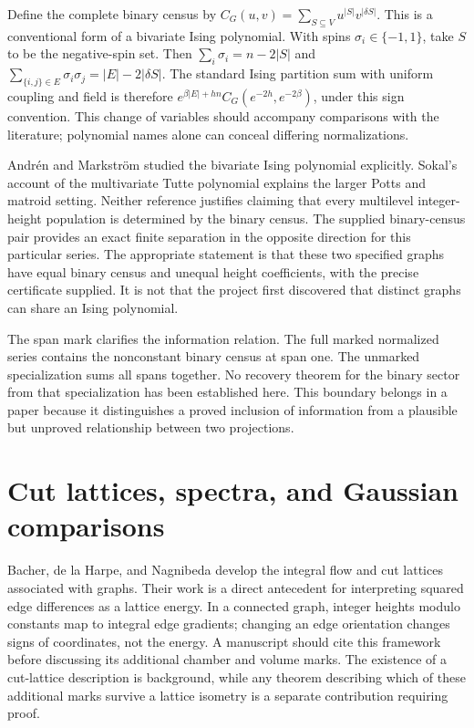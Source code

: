 \documentclass[
  11pt,
  a4paper,
]{report}
\begin{document}
Define the complete binary census by
\(C_G(u,v)=\sum_{S\subseteq V}u^{|S|}v^{|\delta S|}\). This is a
conventional form of a bivariate Ising polynomial. With spins
\(\sigma_i\in\{-1,1\}\), take \(S\) to be the negative-spin set. Then
\(\sum_i\sigma_i=n-2|S|\) and
\(\sum_{\{i,j\}\in E}\sigma_i\sigma_j=|E|-2|\delta S|\). The standard
Ising partition sum with uniform coupling and field is therefore
\(e^{\beta|E|+hn}C_G(e^{-2h},e^{-2\beta})\), under this sign convention.
This change of variables should accompany comparisons with the
literature; polynomial names alone can conceal differing normalizations.

Andrén and Markström studied the bivariate Ising polynomial explicitly.
Sokal's account of the multivariate Tutte polynomial explains the larger
Potts and matroid setting. Neither reference justifies claiming that
every multilevel integer-height population is determined by the binary
census. The supplied binary-census pair provides an exact finite
separation in the opposite direction for this particular series. The
appropriate statement is that these two specified graphs have equal
binary census and unequal height coefficients, with the precise
certificate supplied. It is not that the project first discovered that
distinct graphs can share an Ising polynomial.

The span mark clarifies the information relation. The full marked
normalized series contains the nonconstant binary census at span one.
The unmarked specialization sums all spans together. No recovery theorem
for the binary sector from that specialization has been established
here. This boundary belongs in a paper because it distinguishes a proved
inclusion of information from a plausible but unproved relationship
between two projections.

\hypertarget{cut-lattices-spectra-and-gaussian-comparisons}{%
\section{Cut lattices, spectra, and Gaussian
comparisons}\label{cut-lattices-spectra-and-gaussian-comparisons}}

Bacher, de la Harpe, and Nagnibeda develop the integral flow and cut
lattices associated with graphs. Their work is a direct antecedent for
interpreting squared edge differences as a lattice energy. In a
connected graph, integer heights modulo constants map to integral edge
gradients; changing an edge orientation changes signs of coordinates,
not the energy. A manuscript should cite this framework before
discussing its additional chamber and volume marks. The existence of a
cut-lattice description is background, while any theorem describing
which of these additional marks survive a lattice isometry is a separate
contribution requiring proof.
\end{document}
